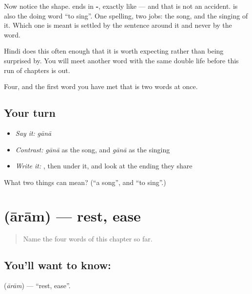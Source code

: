 Now notice the shape.  ends in \textbf{-}, exactly like  — and that is not an accident.  is also the doing word \textquotedblleft{}to sing\textquotedblright{}. One spelling, two jobs: the song, and the singing of it. Which one is meant is settled by the sentence around it and never by the word.

Hindi does this often enough that it is worth expecting rather than being surprised by. You will meet another word with the same double life before this run of chapters is out.

\begin{grammarlens}[title={What you've built}]
Four, and the first word you have met that is two words at once.
\end{grammarlens}

\subsection*{Your turn}
\begin{itemize}
\raggedright
  \item \emph{Say it:} \emph{gānā}
  \item \emph{Contrast:} \emph{gānā} as the song, and \emph{gānā} as the singing
  \item \emph{Write it:} , then  under it, and look at the ending they share
\end{itemize}

\begin{tcolorbox}[breakable,colback=teal!4,colframe=teal!35!black,title={Before you move on}]
What two things can  mean? (\textquotedblleft{}a song\textquotedblright{}, and \textquotedblleft{}to sing\textquotedblright{}.)
\end{tcolorbox}
\section[ārām]{ (ārām) — rest, ease}

\label{lesson:HI-C70-rest}



\begin{quote}
Name the four words of this chapter so far.
\end{quote}

\subsection*{You'll want to know: }
\textbf{} (\emph{ārām}) — \textquotedblleft{}rest, ease\textquotedblright{}.

